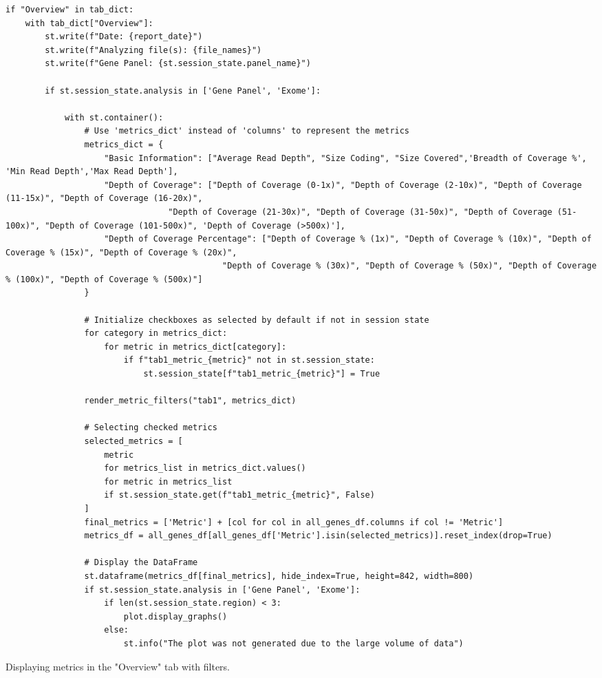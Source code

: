 \begin{longlisting}
\begin{verbatim}
if "Overview" in tab_dict:
    with tab_dict["Overview"]:
        st.write(f"Date: {report_date}")
        st.write(f"Analyzing file(s): {file_names}")
        st.write(f"Gene Panel: {st.session_state.panel_name}")

        if st.session_state.analysis in ['Gene Panel', 'Exome']:
            
            with st.container():
                # Use 'metrics_dict' instead of 'columns' to represent the metrics
                metrics_dict = {
                    "Basic Information": ["Average Read Depth", "Size Coding", "Size Covered",'Breadth of Coverage %', 'Min Read Depth','Max Read Depth'],
                    "Depth of Coverage": ["Depth of Coverage (0-1x)", "Depth of Coverage (2-10x)", "Depth of Coverage (11-15x)", "Depth of Coverage (16-20x)",
                                 "Depth of Coverage (21-30x)", "Depth of Coverage (31-50x)", "Depth of Coverage (51-100x)", "Depth of Coverage (101-500x)", 'Depth of Coverage (>500x)'],
                    "Depth of Coverage Percentage": ["Depth of Coverage % (1x)", "Depth of Coverage % (10x)", "Depth of Coverage % (15x)", "Depth of Coverage % (20x)",
                                            "Depth of Coverage % (30x)", "Depth of Coverage % (50x)", "Depth of Coverage % (100x)", "Depth of Coverage % (500x)"]
                }

                # Initialize checkboxes as selected by default if not in session state
                for category in metrics_dict:
                    for metric in metrics_dict[category]:
                        if f"tab1_metric_{metric}" not in st.session_state:
                            st.session_state[f"tab1_metric_{metric}"] = True

                render_metric_filters("tab1", metrics_dict)

                # Selecting checked metrics
                selected_metrics = [
                    metric
                    for metrics_list in metrics_dict.values()
                    for metric in metrics_list
                    if st.session_state.get(f"tab1_metric_{metric}", False)
                ]
                final_metrics = ['Metric'] + [col for col in all_genes_df.columns if col != 'Metric']
                metrics_df = all_genes_df[all_genes_df['Metric'].isin(selected_metrics)].reset_index(drop=True)

                # Display the DataFrame
                st.dataframe(metrics_df[final_metrics], hide_index=True, height=842, width=800)
                if st.session_state.analysis in ['Gene Panel', 'Exome']:
                    if len(st.session_state.region) < 3:
                        plot.display_graphs()
                    else:
                        st.info("The plot was not generated due to the large volume of data")
\end{verbatim}
\caption{Displaying metrics in the "Overview" tab with filters.}
\label{code:results-overview-tab}
\end{longlisting}

